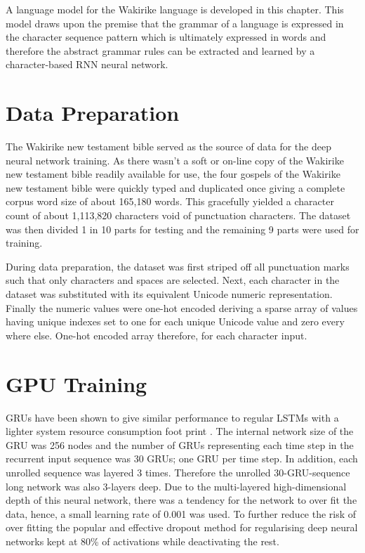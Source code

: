 A language model for the Wakirike language is developed in this chapter.  This model draws upon the premise that the grammar of a language is expressed in the character sequence pattern which is ultimately expressed in words and therefore the abstract grammar rules can be extracted and learned by a character-based RNN neural network.

\section{Data Preparation}
The Wakirike new testament bible served as the source of data for the deep neural network training. As there wasn’t a soft or on-line copy of the Wakirike new testament bible readily available for use, the four gospels of the Wakirike new testament bible were quickly typed and duplicated once giving a complete corpus word size of about 165,180 words. This gracefully yielded a character count of about 1,113,820 characters void of punctuation characters. The dataset was then divided 1 in 10 parts for testing and the remaining 9 parts were used for training.

During data preparation, the dataset was first striped off all punctuation marks such that only characters and spaces are selected. Next, each character in the dataset was substituted with its equivalent Unicode numeric representation. Finally the numeric values were one-hot encoded deriving a sparse array of values having unique indexes set to one for each unique Unicode value and zero every where else. One-hot encoded array therefore, for each character input.
\section{GPU Training}
GRUs have been shown to give similar performance to regular LSTMs with a lighter system resource consumption foot print \cite{cho2014learning}. The internal network size of the GRU was 256 nodes and the number of GRUs representing each time step in the recurrent input sequence was 30 GRUs; one GRU per time step. In addition, each unrolled sequence was layered 3 times. Therefore the unrolled 30-GRU-sequence long network was also 3-layers deep. Due to the multi-layered high-dimensional depth of this neural network, there was a tendency for the network to over fit the data, hence, a small learning rate of 0.001 was used. To further reduce the risk of over fitting the popular and effective dropout method for regularising deep neural networks kept at 80\% of activations while deactivating the rest.